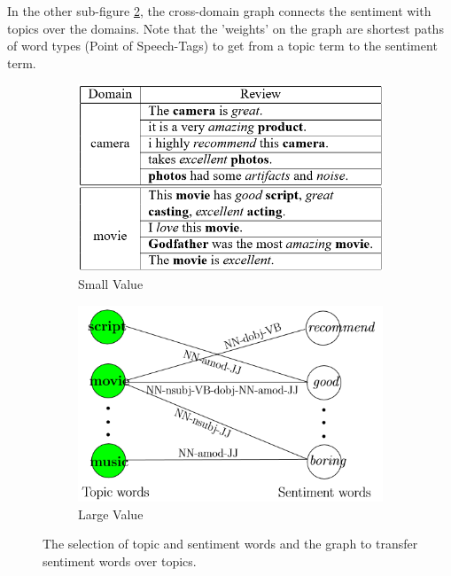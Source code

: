 In the other sub-figure \ref{FigRelationGraph}, the cross-domain graph connects the sentiment with topics over the domains.
Note that the 'weights' on the graph are shortest paths of word types (Point of Speech-Tags) to get from a topic term to the sentiment term.
\begin{figure}
	\centering
	\begin{subfigure}{.5\textwidth}
		\centering
		\includegraphics[width=1\linewidth]{figures/CaseTopicSentiment.png}
		\caption{Small Value \label{FigWordGraph}}
	\end{subfigure}%
	\begin{subfigure}{.5\textwidth}
		\centering
		\includegraphics[width=1\linewidth]{figures/RelationGraph.png}
		\caption{Large Value \label{FigRelationGraph}}
	\end{subfigure}
	\caption[Summary of Transfer by Relational Adaptive bootstrapping]{The selection of topic and sentiment words and the graph to transfer sentiment words over topics.\cite{Li.2015}}
	\label{FigRapRelationGraph}
\end{figure}

